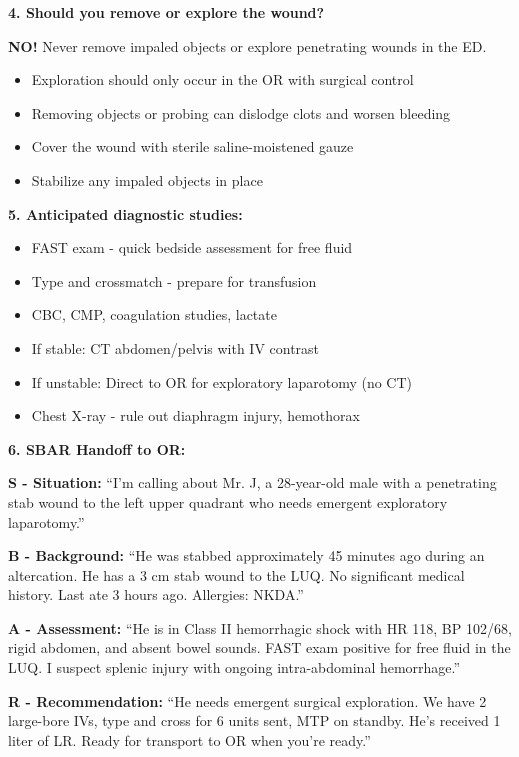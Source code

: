 \documentclass[11pt]{article}
\begin{document}
\begin{tcolorbox}[colback=green!5!white,colframe=green!75!black,title=Case Study 3 - Answers]
\textbf{4. Should you remove or explore the wound?}

\textbf{NO!} Never remove impaled objects or explore penetrating wounds in the ED.
\begin{itemize}
    \item Exploration should only occur in the OR with surgical control
    \item Removing objects or probing can dislodge clots and worsen bleeding
    \item Cover the wound with sterile saline-moistened gauze
    \item Stabilize any impaled objects in place
\end{itemize}

\textbf{5. Anticipated diagnostic studies:}

\begin{itemize}
    \item FAST exam - quick bedside assessment for free fluid
    \item Type and crossmatch - prepare for transfusion
    \item CBC, CMP, coagulation studies, lactate
    \item If stable: CT abdomen/pelvis with IV contrast
    \item If unstable: Direct to OR for exploratory laparotomy (no CT)
    \item Chest X-ray - rule out diaphragm injury, hemothorax
\end{itemize}

\textbf{6. SBAR Handoff to OR:}

\begin{tcolorbox}[colback=blue!5!white,colframe=blue!75!black,title=SBAR Handoff]
\textbf{S - Situation:}
``I'm calling about Mr. J, a 28-year-old male with a penetrating stab wound to the left upper quadrant who needs emergent exploratory laparotomy.''

\textbf{B - Background:}
``He was stabbed approximately 45 minutes ago during an altercation. He has a 3 cm stab wound to the LUQ. No significant medical history. Last ate 3 hours ago. Allergies: NKDA.''

\textbf{A - Assessment:}
``He is in Class II hemorrhagic shock with HR 118, BP 102/68, rigid abdomen, and absent bowel sounds. FAST exam positive for free fluid in the LUQ. I suspect splenic injury with ongoing intra-abdominal hemorrhage.''

\textbf{R - Recommendation:}
``He needs emergent surgical exploration. We have 2 large-bore IVs, type and cross for 6 units sent, MTP on standby. He's received 1 liter of LR. Ready for transport to OR when you're ready.''
\end{tcolorbox}

\end{tcolorbox}
\end{document}
